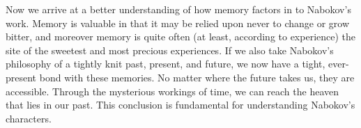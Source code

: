 Now we arrive at a better understanding of how memory factors in to Nabokov's work. 
Memory is valuable in that it may be relied upon never to change or grow bitter, and moreover memory is quite often (at least, according to experience) the site of the sweetest and most precious experiences.
If we also take Nabokov's philosophy of a tightly knit past, present, and future, we now have a tight, ever-present bond with these memories.
No matter where the future takes us, they are accessible. 
Through the mysterious workings of time, we can reach the heaven that lies in our past. 
This conclusion is fundamental for understanding Nabokov's characters.

